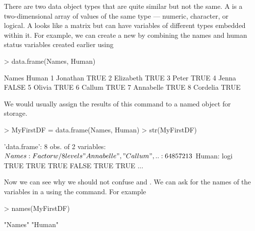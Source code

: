 There are two data object types that are quite similar but not the same. A  is a two-dimensional array of values of the same type --- numeric, character, or logical. A  looks like a matrix but can have variables of different types embedded within it. For example, we can create a new  by combining the names and human status variables created earlier using
\begin{Schunk}
\begin{Sinput}
> data.frame(Names, Human)
\end{Sinput}
\begin{Soutput}
      Names Human
1  Jonathan  TRUE
2 Elizabeth  TRUE
3     Peter  TRUE
4     Jenna FALSE
5    Olivia  TRUE
6    Callum  TRUE
7 Annabelle  TRUE
8  Cordelia  TRUE
\end{Soutput}
\end{Schunk}
We would usually assign the results of this command to a named object for storage.
\begin{Schunk}
\begin{Sinput}
> MyFirstDF = data.frame(Names, Human)
> str(MyFirstDF)
\end{Sinput}
\begin{Soutput}
'data.frame':	8 obs. of  2 variables:
 $ Names: Factor w/ 8 levels "Annabelle","Callum",..: 6 4 8 5 7 2 1 3
 $ Human: logi  TRUE TRUE TRUE FALSE TRUE TRUE ...
\end{Soutput}
\end{Schunk}

Now we can see why we should not confuse  and . We can ask for the names of the variables in a  using the  command. For example
\begin{Schunk}
\begin{Sinput}
> names(MyFirstDF)
\end{Sinput}
\begin{Soutput}
[1] "Names" "Human"
\end{Soutput}
\end{Schunk}

